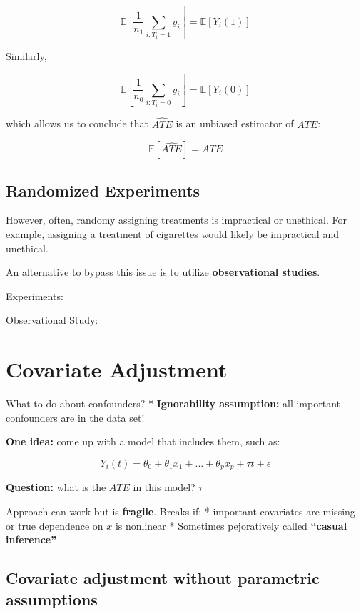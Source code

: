 \documentclass[
  letterpaper,
  DIV=11,
  numbers=noendperiod]{scrreprt}
\begin{document}
\[\mathbb{E}[\frac{1}{n_{1}}\sum_{i: T_{i} = 1}{y_{i}}] = \mathbb{E}[Y_{i}(1)]\]

Similarly,

\[\mathbb{E}[\frac{1}{n_{0}}\sum_{i: T_{i} = 0}{y_{i}}] = \mathbb{E}[Y_{i}(0)]\]

which allows us to conclude that \(\hat{ATE}\) is an unbiased estimator
of \(ATE\):

\[\mathbb{E}[\hat{ATE}] = ATE\]

\hypertarget{randomized-experiments}{%
\subsection{Randomized Experiments}\label{randomized-experiments}}

However, often, randomy assigning treatments is impractical or
unethical. For example, assigning a treatment of cigarettes would likely
be impractical and unethical.

An alternative to bypass this issue is to utilize \textbf{observational
studies}.

Experiments:

Observational Study:

\hypertarget{covariate-adjustment}{%
\section{Covariate Adjustment}\label{covariate-adjustment}}

What to do about confounders? * \textbf{Ignorability assumption:} all
important confounders are in the data set!

\textbf{One idea:} come up with a model that includes them, such as:

\[Y_{i}(t) = \theta_{0} + \theta_{1}x_{1} + ... + \theta_{p}x_{p} + \tau{t} + \epsilon\]

\textbf{Question:} what is the \(ATE\) in this model? \(\tau\)

Approach can work but is \textbf{fragile}. Breaks if: * important
covariates are missing or true dependence on \(x\) is nonlinear *
Sometimes pejoratively called \textbf{``casual inference''}

\hypertarget{covariate-adjustment-without-parametric-assumptions}{%
\subsection{Covariate adjustment without parametric
assumptions}\label{covariate-adjustment-without-parametric-assumptions}}
\end{document}
